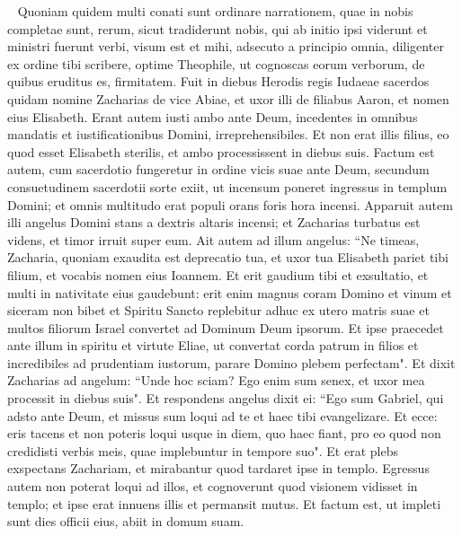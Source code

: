 
\begin{biblechapter}   
\verse Quoniam quidem multi conati sunt ordinare narrationem, quae in nobis completae sunt, rerum, 
\verse sicut tradiderunt nobis, qui ab initio ipsi viderunt et ministri fuerunt verbi, 
\verse visum est et mihi, adsecuto a principio omnia, diligenter ex ordine tibi scribere, optime Theophile, 
\verse ut cognoscas eorum verborum, de quibus eruditus es, firmitatem. 
\verse Fuit in diebus Herodis regis Iudaeae sacerdos quidam nomine Zacharias de vice Abiae, et uxor illi de filiabus Aaron, et nomen eius Elisabeth. 
\verse Erant autem iusti ambo ante Deum, incedentes in omnibus mandatis et iustificationibus Domini, irreprehensibiles. 
\verse Et non erat illis filius, eo quod esset Elisabeth sterilis, et ambo processissent in diebus suis. 
\verse Factum est autem, cum sacerdotio fungeretur in ordine vicis suae ante Deum,  
\verse secundum consuetudinem sacerdotii sorte exiit, ut incensum poneret ingressus in templum Domini; 
\verse et omnis multitudo erat populi orans foris hora incensi. 
\verse Apparuit autem illi angelus Domini stans a dextris altaris incensi; 
\verse et Zacharias turbatus est videns, et timor irruit super eum.  
\verse Ait autem ad illum angelus: “Ne timeas, Zacharia, quoniam exaudita est deprecatio tua, et uxor tua Elisabeth pariet tibi filium, et vocabis nomen eius Ioannem. 
\verse Et erit gaudium tibi et exsultatio, et multi in nativitate eius gaudebunt: 
\verse erit enim magnus coram Domino et vinum et siceram non bibet et Spiritu Sancto replebitur adhuc ex utero matris suae 
\verse et multos filiorum Israel convertet ad Dominum Deum ipsorum. 
\verse Et ipse praecedet ante illum in spiritu et virtute Eliae, ut convertat corda patrum in filios et incredibiles ad prudentiam iustorum, parare Domino plebem perfectam". 
\verse Et dixit Zacharias ad angelum: “Unde hoc sciam? Ego enim sum senex, et uxor mea processit in diebus suis". 
\verse Et respondens angelus dixit ei: “Ego sum Gabriel, qui adsto ante Deum, et missus sum loqui ad te et haec tibi evangelizare. 
\verse Et ecce: eris tacens et non poteris loqui usque in diem, quo haec fiant, pro eo quod non credidisti verbis meis, quae implebuntur in tempore suo". 
\verse Et erat plebs exspectans Zachariam, et mirabantur quod tardaret ipse in templo. 
\verse Egressus autem non poterat loqui ad illos, et cognoverunt quod visionem vidisset in templo; et ipse erat innuens illis et permansit mutus. 
\verse Et factum est, ut impleti sunt dies officii eius, abiit in domum suam. 

\end{biblechapter}

